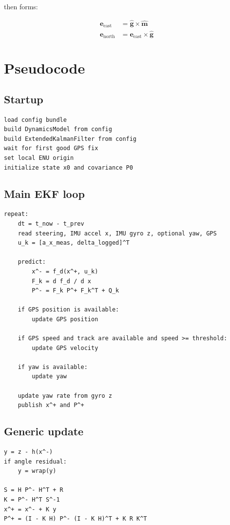 \documentclass[11pt]{article}
\newcommand{\vect}[1]{\boldsymbol{#1}}
\begin{document}
then forms:

\begin{align}
\vect{e}_{\text{east}} &= \hat{\vect{g}} \times \hat{\vect{m}} \\
\vect{e}_{\text{north}} &= \vect{e}_{\text{east}} \times \hat{\vect{g}}
\end{align}

\section{Pseudocode}

\subsection{Startup}

\begin{lstlisting}
load config bundle
build DynamicsModel from config
build ExtendedKalmanFilter from config
wait for first good GPS fix
set local ENU origin
initialize state x0 and covariance P0
\end{lstlisting}

\subsection{Main EKF loop}

\begin{lstlisting}
repeat:
    dt = t_now - t_prev
    read steering, IMU accel x, IMU gyro z, optional yaw, GPS
    u_k = [a_x_meas, delta_logged]^T

    predict:
        x^- = f_d(x^+, u_k)
        F_k = d f_d / d x
        P^- = F_k P^+ F_k^T + Q_k

    if GPS position is available:
        update GPS position

    if GPS speed and track are available and speed >= threshold:
        update GPS velocity

    if yaw is available:
        update yaw

    update yaw rate from gyro z
    publish x^+ and P^+
\end{lstlisting}

\subsection{Generic update}

\begin{lstlisting}
y = z - h(x^-)
if angle residual:
    y = wrap(y)

S = H P^- H^T + R
K = P^- H^T S^-1
x^+ = x^- + K y
P^+ = (I - K H) P^- (I - K H)^T + K R K^T
\end{lstlisting}
\end{document}
